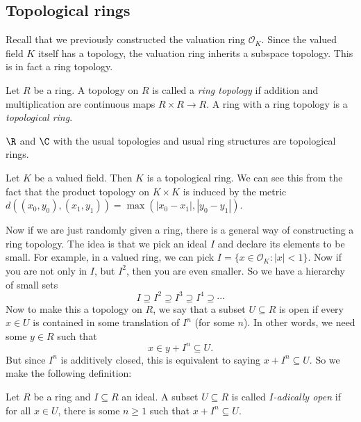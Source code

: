 \documentclass[a4paper]{article}
\begin{document}
\subsection{Topological rings}
Recall that we previously constructed the valuation ring $\mathcal{O}_K$. Since the valued field $K$ itself has a topology, the valuation ring inherits a subspace topology. This is in fact a ring topology.

\begin{defi}
  Let $R$ be a ring. A topology on $R$ is called a \emph{ring topology} if addition and multiplication are continuous maps $R \times R \to R$. A ring with a ring topology is a \emph{topological ring}.
\end{defi}

\begin{eg}
  $\R$ and $\C$ with the usual topologies and usual ring structures are topological rings.
\end{eg}

\begin{ex}
  Let $K$ be a valued field. Then $K$ is a topological ring. We can see this from the fact that the product topology on $K \times K$ is induced by the metric $d((x_0, y_0), (x_1, y_1)) = \max(|x_0 - x_1|, |y_0 - y_1|)$.
\end{ex}

Now if we are just randomly given a ring, there is a general way of constructing a ring topology. The idea is that we pick an ideal $I$ and declare its elements to be small. For example, in a valued ring, we can pick $I = \{x \in \mathcal{O}_K: |x| < 1\}$. Now if you are not only in $I$, but $I^2$, then you are even smaller. So we have a hierarchy of small sets
\[
  I \supseteq I^2 \supseteq I^3 \supseteq I^4 \supseteq\cdots
\]
Now to make this a topology on $R$, we say that a subset $U \subseteq R$ is open if every $x \in U$ is contained in some translation of $I^n$ (for some $n$). In other words, we need some $y \in R$ such that
\[
  x \in y + I^n \subseteq U.
\]
But since $I^n$ is additively closed, this is equivalent to saying $x + I^n \subseteq U$. So we make the following definition:

\begin{defi}
  Let $R$ be a ring and $I \subseteq R$ an ideal. A subset $U \subseteq R$ is called \emph{$I$-adically open} if for all $x \in U$, there is some $n \geq 1$ such that $x + I^n \subseteq U$.
\end{defi}
\end{document}
